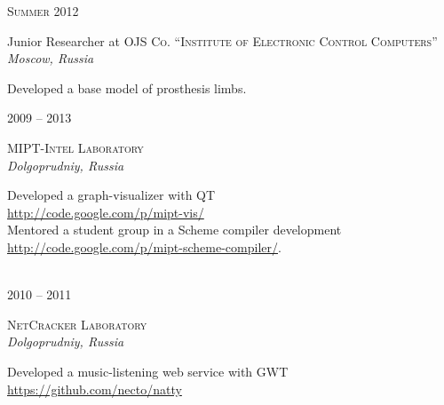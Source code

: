\documentclass[10pt]{article} %
\begin{document}
\begin{minipage}[h]{0.5\textwidth}

{\raggedleft\textsc{Summer 2012}\par}

{\raggedright\large Junior Researcher at \textsc{OJS Co. ``Institute of Electronic Control Computers''}\\
\textit{Moscow, Russia}\\[4pt]}

\normalsize{Developed a base model of prosthesis limbs.}\\


{\raggedleft\textsc{2009 -- 2013}\par}

{\raggedright\large \textsc{MIPT-Intel Laboratory}\\
\textit{Dolgoprudniy, Russia}\\[4pt]}

\normalsize{
 Developed a graph-visualizer with QT\\ \url{http://code.google.com/p/mipt-vis/}\\
 Mentored a student group in a Scheme compiler development\\ \url{http://code.google.com/p/mipt-scheme-compiler/}.\\
}\\


{\raggedleft\textsc{2010 -- 2011}\par}

{\raggedright\large \textsc{NetCracker Laboratory}\\
\textit{Dolgoprudniy, Russia}\\[4pt]}

\normalsize{Developed a music-listening web service with GWT\\\url{https://github.com/necto/natty}}\\


\end{minipage} %
\hfill
\end{document}
